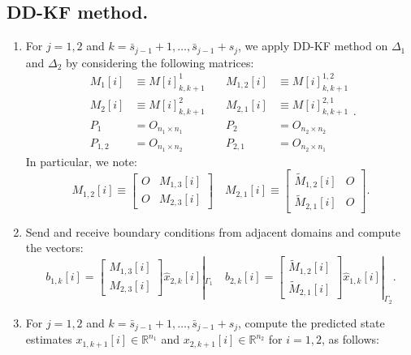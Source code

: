 \documentclass[smallcondensed]{svjour3}
\begin{document}
\subsection{DD-KF method.}
\begin{enumerate}
\item For $j=1,2$ and $k=\bar{s}_{j-1}+1,\ldots,\bar{s}_{j-1}+s_{j}$, we apply  DD-KF method on $\Delta_{1}$ and $\Delta_{2}$ by considering the following matrices:
\begin{equation}
\begin{array}{llllll}
M_{1}[i]&\equiv M[i]_{k,k+1}^{1} &\quad M_{1,2}[i]&\equiv M[i]_{k,k+1}^{1,2}\\
M_{2}[i]&\equiv M[i]_{k,k+1}^{2}& \quad M_{2,1}[i]&\equiv M[i]_{k,k+1}^{2,1}\\
P_{1}&=O_{n_{1}\times n_{1}}& \quad  P_{2}&=O_{n_{2}\times n_{2}}\\ P_{1,2}&=O_{n_{1}\times n_{2}} & \quad P_{2,1}&=O_{n_{2}\times n_{1}}
\end{array}.
\end{equation}
In particular, we note:
\begin{equation}
    M_{1,2}[i]\equiv \left[\begin{array}{lll} O & M_{1,3}[i]\\ 
    O& M_{2,3}[i]
    \end{array}\right]\quad  M_{2,1}[i]\equiv \left[\begin{array}{lll} \tilde{M}_{1,2}[i] & O\\ 
     \tilde{M}_{2,1}[i] & O
    \end{array}\right].
\end{equation}
\item Send and receive  boundary conditions from  adjacent domains and compute the vectors:
\begin{equation}\label{boundary}
b_{1,k}[i]=\left[\begin{array}{lll} M_{1,3}[i]\\ 
    M_{2,3}[i]
    \end{array}\right]\widehat{x}_{2,k}[i]|_{\Gamma_{1}} \quad
    b_{2,k}[i]=\left[\begin{array}{lll} \tilde{M}_{1,2}[i]\\ 
    \tilde{M}_{2,1}[i]
    \end{array}\right]\widehat{x}_{1,k}[i]|_{\Gamma_{2}}.
\end{equation}
\item For $j=1,2$ and $k=\bar{s}_{j-1}+1,\ldots,\bar{s}_{j-1}+s_{j}$, compute the predicted state estimates $x_{1,k+1}[i]\in \mathbb{R}^{n_{1}}$ and $x_{2,k+1}[i]\in \mathbb{R}^{n_{2}}$ for $ i=1,2$, as follows:

\end{enumerate}
\end{document}
